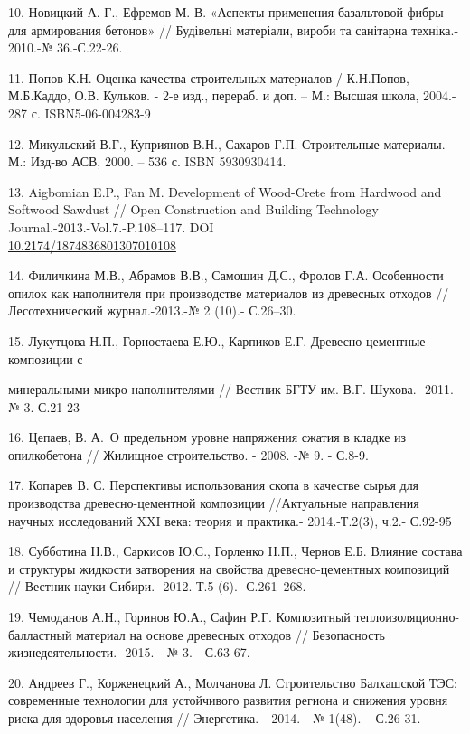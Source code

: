 \begin{references}
10. Новицкий А. Г., Ефремов М. В. «Аспекты применения базальтовой фибры
для армирования бетонов» // Будівельнi матеріали, вироби та санітарна
техніка.- 2010.-№ 36.-С.22-26.
\href{http://www.irbis-nbuv.gov.ua/cgi-bin/irbis_nbuv/cgiirbis_64.exe?I21DBN=LINK&P21DBN=UJRN&Z21ID=&S21REF=10&S21CNR=20&S21STN=1&S21FMT=ASP_meta&C21COM=S&2_S21P03=FILA=&2_S21STR=bmvs_2010_36_5}{}

11. Попов К.Н. Оценка качества строительных материалов / К.Н.Попов,
М.Б.Каддо, О.В. Кульков. - 2-е изд., перераб. и доп. -- М.: Высшая
школа, 2004.- 287 с. ISBN5-06-004283-9

12. Микульский В.Г., Куприянов В.Н., Сахаров Г.П. Строительные
материалы.- М.: Изд-во АСВ, 2000. -- 536 с. ISBN 5930930414.

13. Aigbomian E.P., Fan M. Development of Wood-Crete from Hardwood and
Softwood Sawdust // Open Construction and Building Technology
Journal.-2013.-Vol.7.-P.108--117.
DOI\\
\href{http://dx.doi.org/10.2174/1874836801307010108}{10.2174/1874836801307010108}

14. Филичкина М.В., Абрамов В.В., Самошин Д.С., Фролов Г.А. Особенности
опилок как наполнителя при производстве материалов из древесных отходов
// Лесотехнический журнал.-2013.-№ 2 (10).- С.26--30.

15. Лукутцова Н.П., Горностаева Е.Ю., Карпиков Е.Г. Древесно-цементные
композиции с

минеральными микро-наполнителями // Вестник БГТУ им. В.Г. Шухова.-
2011. -№ 3.-С.21-23

16. Цепаев, В. А.~О предельном уровне напряжения сжатия в кладке из
опилкобетона // Жилищное строительство. - 2008. -№ 9. - С.8-9.

17. Копарев В. С. Перспективы использования скопа в качестве сырья для
производства древесно-цементной композиции //Актуальные направления
научных исследований XXI века: теория и практика.- 2014.-Т.2(3), ч.2.-
С.92-95

18. Субботина Н.В., Саркисов Ю.С., Горленко Н.П., Чернов Е.Б. Влияние
состава и структуры жидкости затворения на свойства древесно-цементных
композиций // Вестник науки Сибири.- 2012.-Т.5 (6).- С.261--268.

19. Чемоданов А.Н., Горинов Ю.А., Сафин Р.Г. Композитный
теплоизоляционно-балластный материал на основе древесных отходов //
Безопасность жизнедеятельности.- 2015. - № 3. - С.63-67.

20. Андреев Г., Корженецкий А., Молчанова Л. Строительство Балхашской
ТЭС: современные технологии для устойчивого развития региона и снижения
уровня риска для здоровья населения // Энергетика. - 2014. - № 1(48). --
С.26-31.
\end{references}


